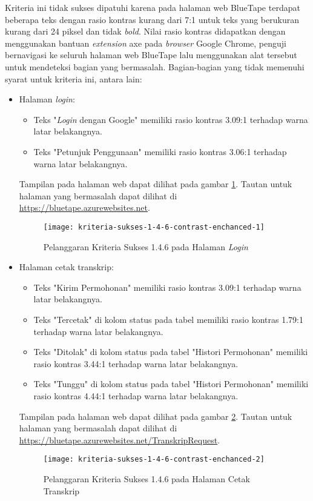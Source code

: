 Kriteria ini tidak sukses dipatuhi karena pada halaman web BlueTape terdapat beberapa teks dengan rasio kontras kurang dari 7:1 untuk teks yang berukuran kurang dari 24 piksel dan tidak \textit{bold}. Nilai rasio kontras didapatkan dengan menggunakan bantuan \textit{extension} axe pada \textit{browser} Google Chrome, penguji bernavigasi ke seluruh halaman web BlueTape lalu menggunakan alat tersebut untuk mendeteksi bagian yang bermasalah. Bagian-bagian yang tidak memenuhi syarat untuk kriteria ini, antara lain:

\begin{itemize}
    \item Halaman \textit{login}: 
    \begin{itemize}
        \item Teks "\textit{Login} dengan Google" memiliki rasio kontras 3.09:1 terhadap warna latar belakangnya.
        \item Teks "Petunjuk Penggunaan" memiliki rasio kontras 3.06:1 terhadap warna latar belakangnya.
    \end{itemize}
    Tampilan pada halaman web dapat dilihat pada gambar \ref{fig:1.4.6_contrast_enchanced_1}. Tautan untuk halaman yang bermasalah dapat dilihat di \url{https://bluetape.azurewebsites.net}.
    \begin{figure}[H]
        \centering  
        \texttt{[image: kriteria-sukses-1-4-6-contrast-enchanced-1]}  
        \caption[Pelanggaran Kriteria Sukses 1.4.6 pada Halaman \textit{Login}]{Pelanggaran Kriteria Sukses 1.4.6 pada Halaman \textit{Login}}
        \label{fig:1.4.6_contrast_enchanced_1}  
    \end{figure} 

    \item Halaman cetak transkrip: 
    \begin{itemize}
        \item Teks "Kirim Permohonan" memiliki rasio kontras 3.09:1 terhadap warna latar belakangnya.
        \item Teks "Tercetak" di kolom status pada tabel memiliki rasio kontras 1.79:1 terhadap warna latar belakangnya.
        \item Teks "Ditolak" di kolom status pada tabel "Histori Permohonan" memiliki rasio kontras 3.44:1 terhadap warna latar belakangnya.
        \item Teks "Tunggu" di kolom status pada tabel "Histori Permohonan" memiliki rasio kontras 4.44:1 terhadap warna latar belakangnya.
    \end{itemize}
    Tampilan pada halaman web dapat dilihat pada gambar \ref{fig:1.4.6_contrast_enchanced_2}. Tautan untuk halaman yang bermasalah dapat dilihat di \url{https://bluetape.azurewebsites.net/TranskripRequest}.
    \begin{figure}[H]
        \centering  
        \texttt{[image: kriteria-sukses-1-4-6-contrast-enchanced-2]}  
        \caption[Pelanggaran Kriteria Sukses 1.4.6 pada Halaman Cetak Transkrip]{Pelanggaran Kriteria Sukses 1.4.6 pada Halaman Cetak Transkrip}
        \label{fig:1.4.6_contrast_enchanced_2}  
    \end{figure} 
    

\end{itemize}
